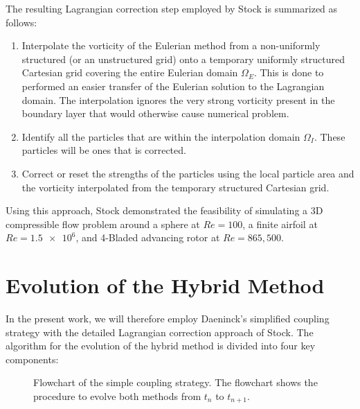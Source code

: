 	The resulting Lagrangian correction step employed by Stock is summarized as follows:
	
	\begin{enumerate}
	\item Interpolate the vorticity of the Eulerian method from a non-uniformly structured (or an unstructured grid) onto a temporary uniformly structured Cartesian grid covering the entire Eulerian domain $\Omega_E$. This is done to performed an easier transfer of the Eulerian solution to the Lagrangian domain. The interpolation ignores the very strong vorticity present in the boundary layer that would otherwise cause numerical problem.
	
	\item Identify all the particles that are within the interpolation domain $\Omega_I$. These particles will be ones that is corrected.
	
	\item Correct or reset the strengths of the particles using the local particle area and the vorticity interpolated from the temporary structured Cartesian grid.
	\end{enumerate}
	
	Using this approach, Stock demonstrated the feasibility of simulating a 3D compressible flow problem around a sphere at $Re=100$, a finite airfoil at $Re=\num{1.5e6}$, and 4-Bladed advancing rotor at $Re=865,500$.
	
	\section{Evolution of the Hybrid Method}

	In the present work, we will therefore employ Daeninck's simplified coupling strategy with the detailed Lagrangian correction approach of Stock. The algorithm for the evolution of the hybrid method is divided into four key components:

	\begin{figure}[H]
		\centering
		\caption{Flowchart of the simple coupling strategy. The flowchart shows the procedure to evolve both methods from $t_n$ to $t_{n+1}$.}
		\label{fig:flowchart_simpleCoupling}
	\end{figure}

